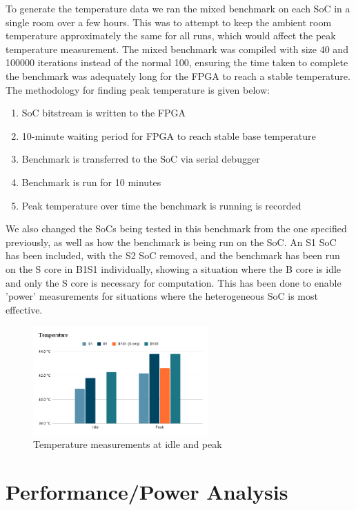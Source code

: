 To generate the temperature data we ran the mixed benchmark on each SoC in a single room over a few hours. This was to attempt to keep the ambient room temperature approximately the same for all runs, which would affect the peak temperature measurement. The mixed benchmark was compiled with size 40 and 100000 iterations instead of the normal 100, ensuring the time taken to complete the benchmark was adequately long for the FPGA to reach a stable temperature. The methodology for finding peak temperature is given below:

\begin{enumerate}
    \item SoC bitstream is written to the FPGA
    \item 10-minute waiting period for FPGA to reach stable base temperature
    \item Benchmark is transferred to the SoC via serial debugger
    \item Benchmark is run for 10 minutes
    \item Peak temperature over time the benchmark is running is recorded
\end{enumerate}

We also changed the SoCs being tested in this benchmark from the one specified previously, as well as how the benchmark is being run on the SoC. An S1 SoC has been included, with the S2 SoC removed, and the benchmark has been run on the S core in B1S1 individually, showing a situation where the B core is idle and only the S core is necessary for computation. This has been done to enable 'power' measurements for situations where the heterogeneous SoC is most effective.

\begin{figure}[H]
    \centering
    \includegraphics[width=0.6\textwidth]{img/Temperature.png}
    \caption{Temperature measurements at idle and peak}
    \label{fig:soc_temps}
\end{figure}

\section{Performance/Power Analysis}
